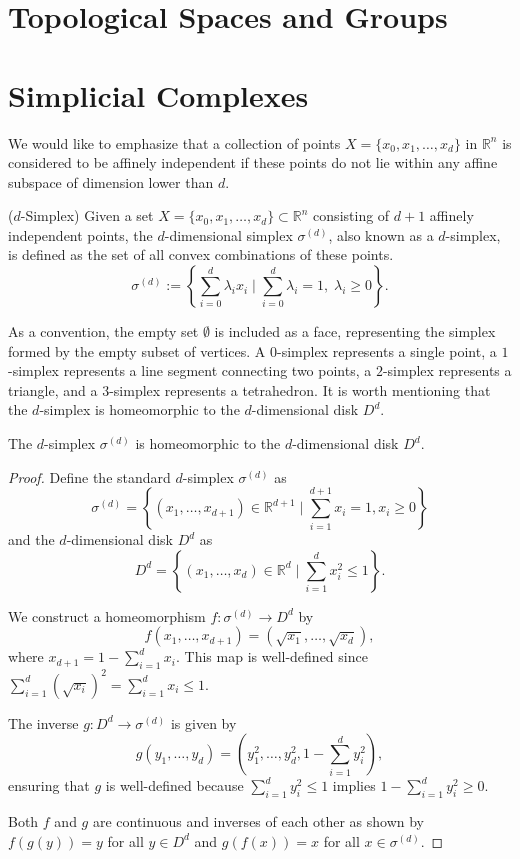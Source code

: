 \section{Topological Spaces and Groups}


\section{Simplicial Complexes}
We would like to emphasize that a collection of points $X = \{x_0, x_1, \ldots, x_d\}$ in $\mathbb{R}^n$ is considered to be affinely independent if these points do not lie within any affine subspace of dimension lower than $d$.

\begin{definition}{($d$-Simplex) \cite[§2.1]{boissonnat2018geometric}}
\label{d-simplex}
Given a set $X = \{x_0, x_1, \ldots, x_d\} \subset \mathbb{R}^n$ consisting of $d+1$ affinely independent points, the $d$-dimensional simplex $\sigma^{(d)}$, also known as a  $d$-simplex, is defined as the set of all convex combinations of these points.
\begin{equation}
	\sigma^{(d)} := \left\{\sum_{i=0}^{d} \lambda_i x_i \; \vert \; \sum_{i=0}^{d} \lambda_i = 1, \; \lambda_i \geq 0 \right\}.
\end{equation}
\end{definition}

As a convention, the empty set $\emptyset$ is included as a face, representing the simplex formed by the empty subset of vertices. A $0$-simplex represents a single point, a $1$-simplex represents a line segment connecting two points, a $2$-simplex represents a triangle, and a $3$-simplex represents a tetrahedron. It is worth mentioning that the $d$-simplex is homeomorphic to the $d$-dimensional disk $D^d$.

\begin{theorem}
The $d$-simplex $\sigma^{(d)}$ is homeomorphic to the $d$-dimensional disk $D^d$.
\end{theorem}

\begin{proof}
Define the standard $d$-simplex $\sigma^{(d)}$ as 
\[
\sigma^{(d)} = \left\{(x_1, \ldots, x_{d+1}) \in \mathbb{R}^{d+1} \mid \sum_{i=1}^{d+1} x_i = 1, x_i \geq 0 \right\}
\]
and the $d$-dimensional disk $D^d$ as 
\[
D^d = \left\{(x_1, \ldots, x_d) \in \mathbb{R}^d \mid \sum_{i=1}^d x_i^2 \leq 1\right\}.
\]

We construct a homeomorphism $f: \sigma^{(d)} \rightarrow D^d$ by
\[
f(x_1, \ldots, x_{d+1}) = (\sqrt{x_1}, \ldots, \sqrt{x_d}),
\]
where $x_{d+1} = 1 - \sum_{i=1}^d x_i$. This map is well-defined since $\sum_{i=1}^d (\sqrt{x_i})^2 = \sum_{i=1}^d x_i \leq 1$.

The inverse $g: D^d \rightarrow \sigma^{(d)}$ is given by
\[
g(y_1, \ldots, y_d) = (y_1^2, \ldots, y_d^2, 1 - \sum_{i=1}^d y_i^2),
\]
ensuring that $g$ is well-defined because $\sum_{i=1}^d y_i^2 \leq 1$ implies $1 - \sum_{i=1}^d y_i^2 \geq 0$.

Both $f$ and $g$ are continuous and inverses of each other as shown by $f(g(y)) = y$ for all $y \in D^d$ and $g(f(x)) = x$ for all $x \in \sigma^{(d)}$.
\end{proof}

